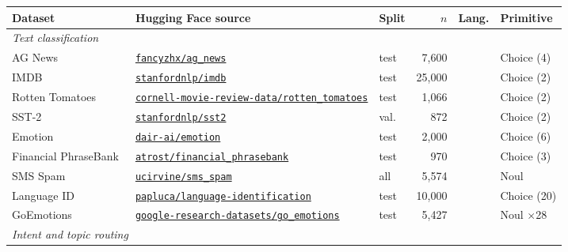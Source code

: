 \begin{tabular}{l l l r r l}
    \toprule
    Dataset & Hugging Face source & Split & $n$ & Lang. & Primitive \\
    \midrule
    \multicolumn{6}{l}{\textit{Text classification}} \\
    AG News~\cite{zhang2015character} & {\scriptsize\href{https://huggingface.co/datasets/fancyzhx/ag_news}{\texttt{fancyzhx/ag\_news}}} & test & 7{,}600 &  & Choice (4) \\
    \rowcolor{gray!10}IMDB~\cite{maas-etal-2011-learning} & {\scriptsize\href{https://huggingface.co/datasets/stanfordnlp/imdb}{\texttt{stanfordnlp/imdb}}} & test & 25{,}000 &  & Choice (2) \\
    Rotten Tomatoes~\cite{pang-lee-2005-seeing} & {\scriptsize\href{https://huggingface.co/datasets/cornell-movie-review-data/rotten_tomatoes}{\texttt{cornell-movie-review-data/rotten\_tomatoes}}} & test & 1{,}066 &  & Choice (2) \\
    \rowcolor{gray!10}SST-2~\cite{socher-etal-2013-recursive} & {\scriptsize\href{https://huggingface.co/datasets/stanfordnlp/sst2}{\texttt{stanfordnlp/sst2}}} & val. & 872 &  & Choice (2) \\
    Emotion~\cite{saravia-etal-2018-carer} & {\scriptsize\href{https://huggingface.co/datasets/dair-ai/emotion}{\texttt{dair-ai/emotion}}} & test & 2{,}000 &  & Choice (6) \\
    \rowcolor{gray!10}Financial PhraseBank~\cite{malo2014good,araci2019finbertfinancialsentimentanalysis} & {\scriptsize\href{https://huggingface.co/datasets/atrost/financial_phrasebank}{\texttt{atrost/financial\_phrasebank}}} & test & 970 &  & Choice (3) \\
    SMS Spam~\cite{Almeida2011SpamFiltering} & {\scriptsize\href{https://huggingface.co/datasets/ucirvine/sms_spam}{\texttt{ucirvine/sms\_spam}}} & all & 5{,}574 &  & Noul \\
    \rowcolor{gray!10}Language ID~\cite{papluca2021langid} & {\scriptsize\href{https://huggingface.co/datasets/papluca/language-identification}{\texttt{papluca/language-identification}}} & test & 10{,}000 &  & Choice (20) \\
    GoEmotions~\cite{demszky-etal-2020-goemotions} & {\scriptsize\href{https://huggingface.co/datasets/google-research-datasets/go_emotions}{\texttt{google-research-datasets/go\_emotions}}} & test & 5{,}427 &  & Noul $\times$28 \\
    \midrule
    \multicolumn{6}{l}{\textit{Intent and topic routing}} \\

\end{tabular}
